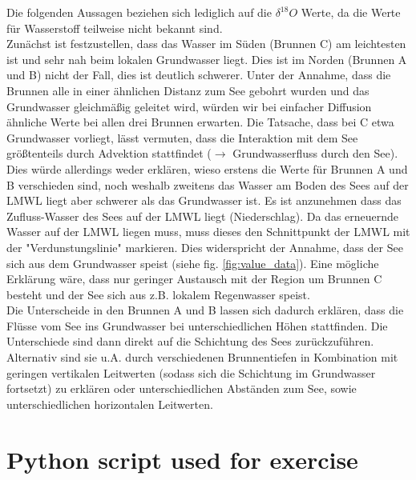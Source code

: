 \documentclass[10pt,a4paper]{article}
\begin{document}
Die folgenden Aussagen beziehen sich lediglich auf die $\delta^{18} O$ Werte, da die Werte für Wasserstoff teilweise nicht bekannt sind. \\ 
Zunächst ist festzustellen, dass das Wasser im Süden (Brunnen C) am leichtesten ist und sehr nah beim lokalen Grundwasser liegt. Dies ist im Norden (Brunnen A und B) nicht der Fall, dies ist deutlich schwerer.
Unter der Annahme, dass die Brunnen alle in einer ähnlichen Distanz zum See gebohrt wurden und das Grundwasser gleichmäßig geleitet wird, würden wir bei einfacher Diffusion ähnliche Werte bei allen drei Brunnen erwarten. Die Tatsache, dass bei C etwa Grundwasser vorliegt, lässt vermuten, dass die Interaktion mit dem See größtenteils durch Advektion stattfindet ($\rightarrow$ Grundwasserfluss durch den See).\\
Dies würde allerdings weder erklären, wieso erstens die Werte für Brunnen A und B verschieden sind, noch weshalb zweitens das Wasser am Boden des Sees auf der LMWL liegt aber schwerer als das Grundwasser ist. Es ist anzunehmen dass das Zufluss-Wasser des Sees auf der LMWL liegt (Niederschlag). Da das erneuernde Wasser auf der LMWL liegen muss, muss dieses den Schnittpunkt der LMWL mit der "Verdunstungslinie" markieren. Dies widerspricht der Annahme, dass der See sich aus dem Grundwasser speist (siehe fig. \ref{fig:value_data}).
Eine mögliche Erklärung wäre, dass nur geringer Austausch mit der Region um Brunnen C besteht und der See sich aus z.B. lokalem Regenwasser speist.\\
Die Unterscheide in den Brunnen A und B lassen sich dadurch erklären, dass die Flüsse vom See ins Grundwasser bei unterschiedlichen Höhen stattfinden. Die Unterschiede sind dann direkt auf die Schichtung des Sees zurückzuführen. Alternativ sind sie u.A. durch verschiedenen Brunnentiefen in Kombination mit geringen vertikalen Leitwerten (sodass sich die Schichtung im Grundwasser fortsetzt) zu erklären oder unterschiedlichen Abständen zum See, sowie unterschiedlichen horizontalen Leitwerten.

\newpage

\section*{Python script used for exercise}

\end{document}
